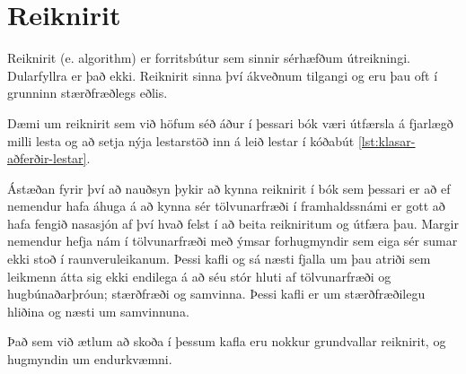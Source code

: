 
\chapter{Reiknirit}\label{k:reiknirit}
Reiknirit (e. algorithm) er forritsbútur sem sinnir sérhæfðum útreikningi.
Dularfyllra er það ekki.
Reiknirit sinna því ákveðnum tilgangi og eru þau oft í grunninn stærðfræðlegs eðlis.

Dæmi um reiknirit sem við höfum séð áður í þessari bók væri útfærsla á fjarlægð milli lesta og að setja nýja lestarstöð inn á leið lestar í kóðabút \ref{lst:klasar-aðferðir-lestar}.

Ástæðan fyrir því að nauðsyn þykir að kynna reiknirit í bók sem þessari er að ef nemendur hafa áhuga á að kynna sér tölvunarfræði í framhaldssnámi er gott að hafa fengið nasasjón af því hvað felst í að beita reikniritum og útfæra þau.
Margir nemendur hefja nám í tölvunarfræði með ýmsar forhugmyndir sem eiga sér sumar ekki stoð í raunveruleikanum.
Þessi kafli og sá næsti fjalla um þau atriði sem leikmenn átta sig ekki endilega á að séu stór hluti af tölvunarfræði og hugbúnaðarþróun; stærðfræði og samvinna.
Þessi kafli er um stærðfræðilegu hliðina og næsti um samvinnuna.

Það sem við ætlum að skoða í þessum kafla eru nokkur grundvallar reiknirit, og hugmyndin um endurkvæmni.





